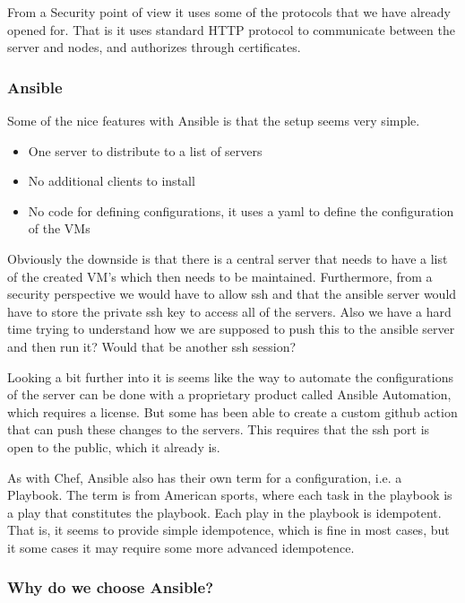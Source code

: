 From a Security point of view it uses some of the protocols that we have already opened for. That is it uses standard HTTP protocol to communicate between the server and nodes, and authorizes through certificates.

\subsubsection{Ansible}

Some of the nice features with Ansible is that the setup seems very simple. 

\begin{itemize}
    \item One server to distribute to a list of servers
    \item No additional clients to install
    \item No code for defining configurations, it uses a yaml to define the configuration of the VMs
\end{itemize}

Obviously the downside is that there is a central server that needs to have a list of the created VM’s which then needs to be maintained. Furthermore, from a security perspective we would have to allow ssh and that the ansible server would have to store the private ssh key to access all of the servers. Also we have a hard time trying to understand how we are supposed to push this to the ansible server and then run it? Would that be another ssh session?

Looking a bit further into it is seems like the way to automate the configurations of the server can be done with a proprietary product called Ansible Automation, which requires a license. But some has been able to create a custom github action that can push these changes to the servers. This requires that the ssh port is open to the public, which it already is.

As with Chef, Ansible also has their own term for a configuration, i.e. a Playbook. The term is from American sports, where each task in the playbook is a play that constitutes the playbook. Each play in the playbook is idempotent. That is, it seems to provide simple idempotence, which is fine in most cases, but it some cases it may require some more advanced idempotence.

\subsubsection{Why do we choose Ansible?}


